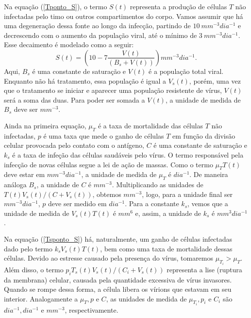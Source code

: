 Na equação (\ref{Tponto_S}), o termo \( S ( t ) \) representa a produção de células \( T \) não infectadas pelo timo ou outros compartimentos do corpo.
Vamos assumir que há uma degeneração dessa fonte ao longo da infecção, partindo de \( 10 \ \unit{mm^{ -3 } dia^{ -1 }} \) e decrescendo com o aumento da população viral, até o mínimo de \( 3 \ \unit{mm^{ -3 } dia^{ -1 }} \).
Esse decaimento é modelado como a seguir:
\begin{equation}
    S ( t ) = \left(
        10  - 7 \frac{ V ( t ) }{ ( B_{ s } + V ( t ) ) } 
    \right)
    \unit{mm^{ -3 } dia^{ -1 }}
.\end{equation}
Aqui, \( B_{ s } \) é uma constante de saturação e \( V ( t ) \) é a população total viral.
Enquanto não há tratamento, essa população é igual a \( V_{ s } ( t ) \), porém, uma vez que o tratamento se iniciar e aparecer uma população resistente de vírus, \( V ( t ) \) será a soma das duas.
Para poder ser somada a \( V ( t ) \), a unidade de medida de \( B_{ s } \) deve ser \( \unit{mm^{ -3 }} \).

Ainda na primeira equação, \( \mu_{ T } \) é a taxa de mortalidade das células \( T \) não infectadas, \( p \) é uma taxa que mede o ganho de células \( T \) em função da divisão celular provocada pelo contato com o antígeno, \( C \) é uma constante de saturação e \( k_{ s } \) é a taxa de infeção das células saudáveis pelo vírus.
O termo responsável pela infecção de novas células segue a lei de ação de massas.
Como o termo \( \mu_{ T } T ( t ) \) deve estar em \( \unit{mm^{ -3 } dia^{ -1 }} \), a unidade de medida de \( \mu_{ T } \) é \( \unit{dia^{ -1 }} \).
De maneira análoga \( B_{ s } \), a unidade de \( C \) é \( \unit{mm^{ -3 }} \).
Multiplicando as unidades de \( T ( t ) V_{ s } ( t ) / ( C + V_{ s } ( t ) ) \), obtemos \( \unit{mm^{ -3 }} \), logo, para a unidade final ser \( \unit{mm^{ -3 } dia^{ -1 }} \), \( p \) deve ser medido em \( \unit{dia^{ -1 }} \).
Para a constante \( k_{ s } \), vemos que a unidade de medida de \( V_{ s } ( t ) T ( t ) \) é \( \unit{mm^{ 6 }} \) e, assim, a unidade de \( k_{ s } \) é \( \unit{mm^{ 3 } dia^{ -1 }} \).


Na equação (\ref{Tsponto_S}) há, naturalmente, um ganho de células infectadas dado pelo termo \( k_{ s } V_{ s } ( t ) T ( t ) \), bem como uma taxa de mortalidade dessas células.
Devido ao estresse causado pela presença do vírus, tomaremos \( \mu_{ T_{ i } } > \mu_{ T } \).
Além disso, o termo \( p_{ i } T_{ s } ( t ) V_{ s } ( t ) / ( C_{ i } + V_{ s } ( t ) ) \) representa a lise (ruptura da membrana) celular, causada pela quantidade excessiva de vírus invasores.
Quando se rompe dessa forma, a célula libera os vírions que estavam em seu interior.
Analogamente a \( \mu_{ T }, p \) e \( C \), as unidades de medida de \( \mu_{ T_{ i } }, p_{ i } \) e \( C_{ i } \) são \( \unit{dia^{ -1 }}, \unit{dia^{ -1 }} \) e \( \unit{mm^{ -3 }} \), respectivamente.

